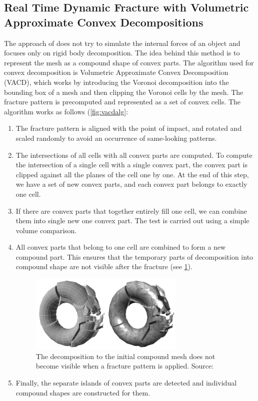 \subsection{Real Time Dynamic Fracture
with Volumetric Approximate Convex Decompositions}
\label{sec:RTDF}
The approach of \citet{nvidia} does not try to simulate the internal forces of an object and focuses only on rigid body decomposition. The idea behind this method is to represent the mesh as a compound shape of convex parts. The algorithm used for convex decomposition is Volumetric Approximate Convex Decomposition (VACD), which works by introducing the Voronoi decomposition into the bounding box of a mesh and then clipping the Voronoi cells by the mesh. The fracture pattern is precomputed and represented as a set of convex cells. The algorithm works as follows (\cref{fig:vacdalg}:
\begin{enumerate}
\item The fracture pattern is aligned with the point of impact, and rotated and scaled randomly to avoid an occurrence of same-looking patterns.
\item The intersections of all cells with all convex parts are computed. To compute the intersection of a single cell with a single convex part, the convex part is clipped against all the planes of the cell one by one. 
At the end of this step, we have a set of new convex parts, and each convex part belongs to exactly one cell.
\item If there are convex parts that together entirely fill one cell, we can combine them into single new one convex part. The test is carried out using a simple volume comparison.
\item All convex parts that belong to one cell are combined to form a new compound part. This ensures that the temporary parts of decomposition into compound shape are not visible after the fracture (see \cref{fig:vacdfracture}).
\begin{figure}
        \centering
        \includegraphics[width=0.7\textwidth]{img/vacdfracture}
        \caption{The decomposition to the
initial compound mesh does not become visible when a fracture
pattern is applied. Source: \citet{nvidia}}
        \label{fig:vacdfracture}
\end{figure}
\item Finally, the separate islands of convex parts are detected and individual compound shapes are constructed for them.
\end{enumerate}

